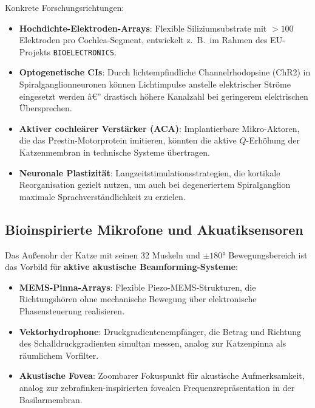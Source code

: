 ﻿\documentclass[12pt,a4paper,titlepage]{report}
\begin{document}
Konkrete Forschungsrichtungen:
\begin{itemize}[leftmargin=2em]
    \item \textbf{Hochdichte-Elektroden-Arrays}: Flexible Siliziumsubstrate mit
        $> 100$ Elektroden pro Cochlea-Segment, entwickelt z.~B.\ im Rahmen des
        EU-Projekts \texttt{BIOELECTRONICS}.
    \item \textbf{Optogenetische CIs}: Durch lichtempfindliche Channelrhodopsine
        (ChR2) in Spiralganglionneuronen können Lichtimpulse anstelle elektrischer
        Ströme eingesetzt werden â€” drastisch höhere Kanalzahl bei geringerem
        elektrischen Übersprechen.
    \item \textbf{Aktiver cochleärer Verstärker (ACA)}: Implantierbare
        Mikro-Aktoren, die das Prestin-Motorprotein imitieren, könnten die
        aktive $Q$-Erhöhung der Katzenmembran in technische Systeme übertragen.
    \item \textbf{Neuronale Plastizität}: Langzeitstimulationsstrategien, die
        kortikale Reorganisation gezielt nutzen, um auch bei degeneriertem
        Spiralganglion maximale Sprachverständlichkeit zu erzielen.
\end{itemize}

\subsection{Bioinspirierte Mikrofone und Akuatiksensoren}

Das Außenohr der Katze mit seinen 32 Muskeln und $\pm 180 °$ Bewegungsbereich
ist das Vorbild für \textbf{aktive akustische Beamforming-Systeme}:
\begin{itemize}[leftmargin=2em]
    \item \textbf{MEMS-Pinna-Arrays}: Flexible Piezo-MEMS-Strukturen, die
        Richtungshören ohne mechanische Bewegung über elektronische Phasensteuerung
        realisieren.
    \item \textbf{Vektorhydrophone}: Druckgradientenempfänger, die Betrag und
        Richtung des Schalldruckgradienten simultan messen, analog zur
        Katzenpinna als räumlichem Vorfilter.
    \item \textbf{Akustische Fovea}: Zoombarer Fokuspunkt für akustische
        Aufmerksamkeit, analog zur zebrafinken-inspirierten fovealen
        Frequenzrepräsentation in der Basilarmembran.
\end{itemize}

\end{document}
